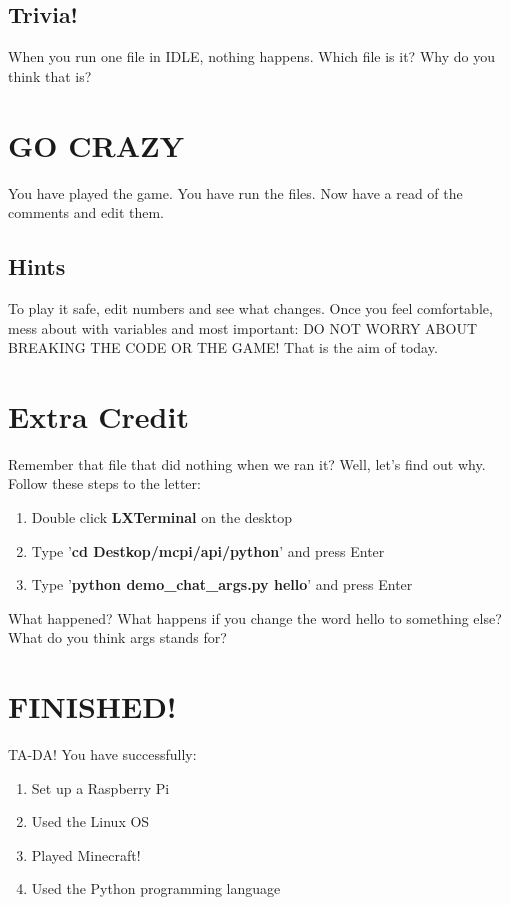 \documentclass[]{paper}
\begin{document}
\subsection{Trivia!}
When you run one file in IDLE, nothing happens. Which file is it? Why do you think that is?

\section{GO CRAZY}
You have played the game. You have run the files. Now have a read of the comments and edit them.

\subsection*{Hints}
To play it safe, edit numbers and see what changes. Once you feel comfortable, mess about with variables and most important: DO NOT WORRY ABOUT BREAKING THE CODE OR THE GAME! That is the aim of today.

\section{Extra Credit}
Remember that file that did nothing when we ran it? Well, let's find out why. Follow these steps to the letter:
\begin{enumerate}
	\item Double click \textbf{LXTerminal} on the desktop
	\item Type '\textbf{cd Destkop/mcpi/api/python}' and press Enter
	\item Type '\textbf{python demo\_chat\_args.py hello}' and press Enter
\end{enumerate}
What happened? What happens if you change the word hello to something else? What do you think args stands for?

\section*{FINISHED!}
TA-DA! You have successfully:
\begin{enumerate}
	\item Set up a Raspberry Pi
	\item Used the Linux OS
	\item Played Minecraft!
	\item Used the Python programming language
\end{enumerate}
\end{document}
